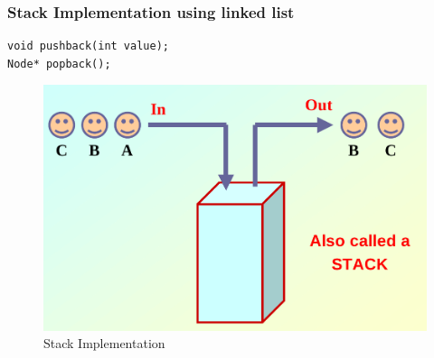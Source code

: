 \documentclass{beamer}
\newtheorem{Key points}{Key points}
\begin{document}
\begin{frame}[fragile]
\frametitle{Stack Implementation using linked list}
\begin{lstlisting}
void pushback(int value);
Node* popback();
\end{lstlisting}
    \begin{figure}
    \centering
         \includegraphics[width=0.51\columnwidth]{stack.png}
    \caption{Stack Implementation}
  \end{figure}
\end{frame}
\end{document}
